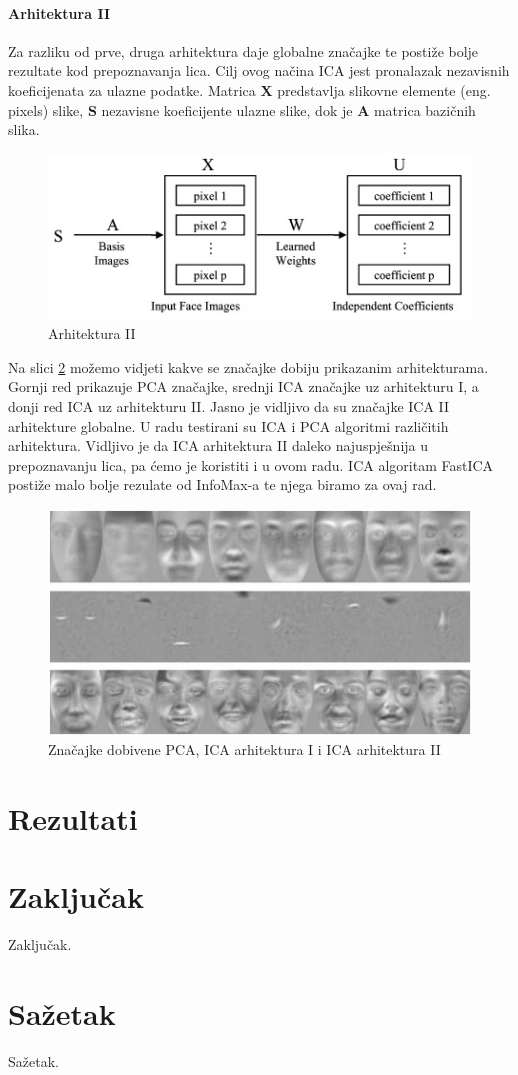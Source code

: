\documentclass[times, utf8, seminar, numeric]{fer}
\renewcommand{\vec}[1]{\mathbf{#1}}
\begin{document}
\subsubsection{Arhitektura II}
Za razliku od prve, druga arhitektura daje globalne značajke te postiže bolje rezultate kod prepoznavanja lica.
Cilj ovog načina ICA jest pronalazak nezavisnih koeficijenata za ulazne podatke. Matrica $\vec{X}$ predstavlja slikovne elemente (eng. pixels) slike, $\vec{S}$ nezavisne koeficijente ulazne slike, dok je $\vec{A}$ matrica bazičnih slika.

\begin{figure}[!htb]
\centering
\includegraphics{raw/prepoznavanje_arh2.jpg}
\caption{Arhitektura II}
\label{fig:prepoznavanje_arh2}
\end{figure}

Na slici \ref{fig:prepoznavanje_znacajke} možemo vidjeti kakve se značajke dobiju prikazanim arhitekturama. Gornji red prikazuje PCA značajke, srednji ICA značajke uz arhitekturu I, a donji red ICA uz arhitekturu II. Jasno je vidljivo da su značajke ICA II arhitekture globalne. U radu \cite{Draper:2003:RFP:950135.950141} testirani su ICA i PCA algoritmi različitih arhitektura. Vidljivo je da ICA arhitektura II daleko najuspješnija u prepoznavanju lica, pa ćemo je koristiti i u ovom radu. ICA algoritam FastICA postiže malo bolje rezulate od InfoMax-a te njega biramo za ovaj rad.

\begin{figure}[!htb]
\centering
\includegraphics{raw/prepoznavanje_znacajke.jpg}
\caption{Značajke dobivene PCA, ICA arhitektura I i ICA arhitektura II}
\label{fig:prepoznavanje_znacajke}
\end{figure}

\chapter{Rezultati}

\chapter{Zaključak}
Zaključak.




\chapter{Sažetak}
Sažetak.
\end{document}

